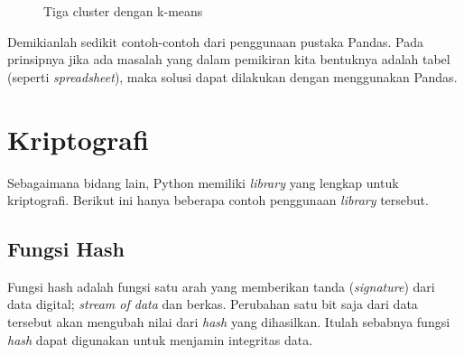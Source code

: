 \begin{figure}[ht]
   \caption{Tiga cluster dengan k-means}
   \label{fig:3cluster-kmeans}
\end{figure}

Demikianlah sedikit contoh-contoh dari penggunaan pustaka Pandas.
Pada prinsipnya jika ada masalah yang dalam pemikiran kita bentuknya
adalah tabel (seperti {\em spreadsheet}), maka solusi dapat dilakukan
dengan menggunakan Pandas.






\section{Kriptografi}
Sebagaimana bidang lain, Python memiliki {\em library} yang lengkap untuk
kriptografi. Berikut ini hanya beberapa contoh penggunaan {\em library}
tersebut.

\subsection{Fungsi Hash}
Fungsi hash adalah fungsi satu arah yang memberikan tanda ({\em signature})
dari data digital; {\em stream of data} dan berkas.
Perubahan satu bit saja dari data tersebut akan mengubah nilai dari
{\em hash} yang dihasilkan. Itulah sebabnya fungsi {\em hash} dapat
digunakan untuk menjamin integritas data.

